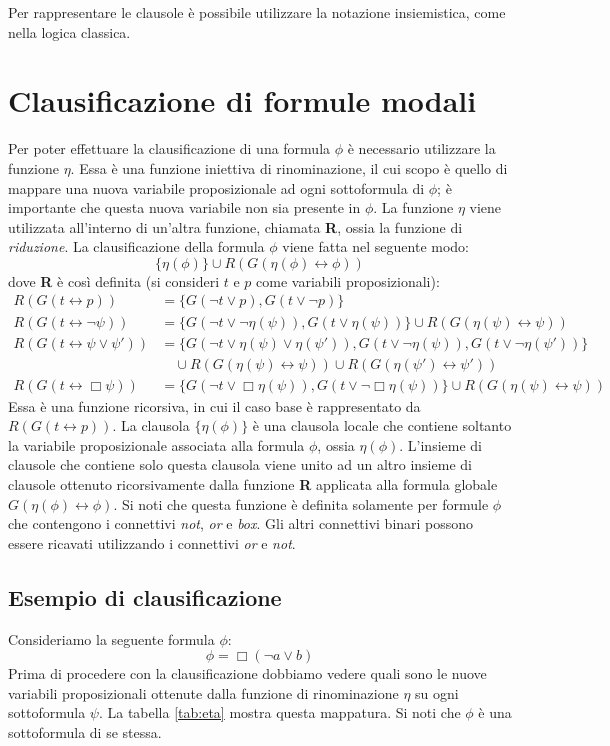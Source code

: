 \documentclass[a4paper,12pt]{report}
\newcommand{\tto} {\leftrightarrow}
\begin{document}
Per rappresentare le clausole è possibile utilizzare la notazione insiemistica, come nella logica classica.

\section{Clausificazione di formule modali}
\label{modal_claus}
Per poter effettuare la clausificazione di una formula $\phi$ è necessario utilizzare la funzione $\eta$. Essa è una funzione iniettiva di rinominazione, il cui scopo è quello di mappare una nuova variabile proposizionale ad ogni sottoformula di $\phi$; è importante che questa nuova variabile non sia presente in $\phi$. La funzione $\eta$ viene utilizzata all'interno di un'altra funzione, chiamata \textbf{R}, ossia la funzione di \emph{riduzione}. La clausificazione della formula $\phi$ viene fatta nel seguente modo:
\[ \{ \eta(\phi) \} \cup R(G(\eta(\phi) \tto \phi)) \]
dove \textbf{R} è così definita (si consideri $t$ e $p$ come variabili proposizionali):
\[
\begin{aligned}
R(G(t \tto p)) &= \{ G(\lnot t \lor p), G(t \lor \lnot p) \} \\
R(G(t \tto \lnot \psi)) &= \{ G(\lnot t \lor \lnot \eta(\psi)), G(t \lor \eta(\psi)) \} \cup R(G(\eta(\psi) \tto \psi)) \\
R(G(t \tto \psi \lor \psi')) &= \{ G(\lnot t \lor \eta(\psi) \lor \eta(\psi')), G(t \lor \lnot \eta(\psi)), G(t \lor \lnot \eta(\psi')) \} \\
& \quad \cup R(G(\eta(\psi) \tto \psi)) \cup R(G(\eta(\psi') \tto \psi')) \\
R(G(t \tto \Box \psi)) &= \{ G(\lnot t \lor \Box \eta(\psi)), G(t \lor \lnot \Box \eta(\psi)) \} \cup R(G(\eta(\psi) \tto \psi))
\end{aligned}
\]
Essa è una funzione ricorsiva, in cui il caso base è rappresentato da $R(G(t \tto p))$. La clausola $\{\eta(\phi)\}$ è una clausola locale che contiene soltanto la variabile proposizionale associata alla formula $\phi$, ossia $\eta(\phi)$. L'insieme di clausole che contiene solo questa clausola viene unito ad un altro insieme di clausole ottenuto ricorsivamente dalla funzione \textbf{R} applicata alla formula globale $G(\eta(\phi) \tto \phi)$. Si noti che questa funzione è definita solamente per formule $\phi$ che contengono i connettivi \emph{not}, \emph{or} e \emph{box}. Gli altri connettivi binari possono essere ricavati utilizzando i connettivi \emph{or} e \emph{not}.

\subsection*{Esempio di clausificazione}
Consideriamo la seguente formula $\phi$:
\[
    \phi = \Box(\lnot a \lor b)
\]
Prima di procedere con la clausificazione dobbiamo vedere quali sono le nuove variabili proposizionali ottenute dalla funzione di rinominazione $\eta$ su ogni sottoformula $\psi$. La tabella \ref{tab:eta} mostra questa mappatura. Si noti che $\phi$ è una sottoformula di se stessa.
\end{document}

